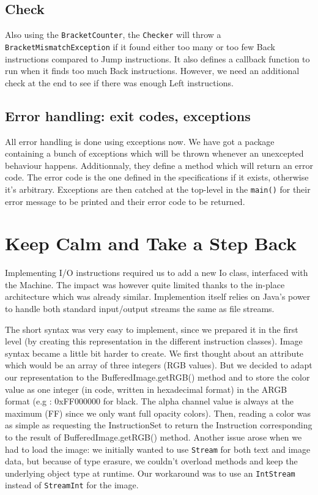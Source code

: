\documentclass{article}
\begin{document}
\subsection{Check}

Also using the \texttt{BracketCounter}, the \texttt{Checker} will throw a \texttt{BracketMismatchException} if it found either too many or too few Back instructions compared to Jump instructions. It also defines a callback function to run when it finds too much Back instructions. However, we need an additional check at the end to see if there was enough Left instructions.

\subsection{Error handling: exit codes, exceptions}

All error handling is done using exceptions now. We have got a package containing a bunch of exceptions which will be thrown whenever an unexcepted behaviour happens. Additionnaly, they define a method which will return an error code. The error code is the one defined in the specifications if it exists, otherwise it's arbitrary. Exceptions are then catched at the top-level in the \texttt{main()} for their error message to be printed and their error code to be returned.

\section{Keep Calm and Take a Step Back}

Implementing I/O instructions required us to add a new Io class, interfaced with the Machine. The impact was however quite limited thanks to the in-place architecture which was already similar. Implemention itself relies on Java's power to handle both standard input/output streams the same as file streams.

The short syntax was very easy to implement, since we prepared it in the first level (by creating this representation in the different instruction classes). Image syntax became a little bit harder to create. We first thought about an attribute which would be an array of three integers (RGB values). But we decided to adapt our representation to the BufferedImage.getRGB() method and to store the color value as one integer (in code, written in hexadecimal format) in the ARGB format (e.g : 0xFF000000 for black. The alpha channel value is always at the maximum (FF) since we only want full opacity colors). Then, reading a color was as simple as requesting the InstructionSet to return the Instruction corresponding to the result of BufferedImage.getRGB() method. Another issue arose when we had to load the image: we initially wanted to use \texttt{Stream} for both text and image data, but because of type erasure, we couldn't overload methods and keep the underlying object type at runtime. Our workaround was to use an \texttt{IntStream} instead of \texttt{StreamInt} for the image.
\end{document}
